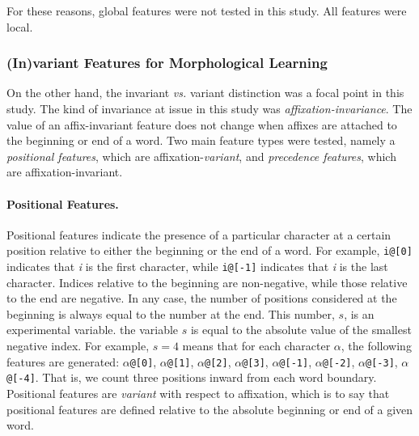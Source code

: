 For these reasons, global features were not tested in this study. All features were local. 


\subsubsection{(In)variant Features for Morphological Learning}
\label{sec:invariant-features}

On the other hand, the invariant \emph{vs.} variant distinction was a focal point in this study. The kind of invariance at issue in this study was \emph{affixation-invariance}. The value of an affix-invariant feature does not change when affixes are attached to the beginning or end of a word. Two main feature types were tested, namely a \emph{positional features}, which are affixation-\emph{variant}, and \emph{precedence features}, which are affixation-invariant.

\paragraph{Positional Features.}
Positional features
indicate the presence of a particular
character at a certain position relative to either the beginning or the end of 
a word. For example, \texttt{i@[0]} indicates that \textit{i} is the first 
character, while \texttt{i@[-1]} indicates that \textit{i} is the last character. 
Indices relative to the beginning are non-negative, while those relative 
to the end are negative. In any case, the number of positions considered 
at the beginning is always equal to the number at the end. This number, 
$s$, is an experimental variable.
the variable $s$ is equal to the absolute value of the smallest negative index. 
For example, $s=4$ means that for each character $\alpha$, the following 
features are generated: $\alpha$\texttt{@[0]}, $\alpha$\texttt{@[1]}, 
$\alpha$\texttt{@[2]}, $\alpha$\texttt{@[3]}, $\alpha$\texttt{@[-1]}, $\alpha$\texttt{@[-2]}, 
$\alpha$\texttt{@[-3]}, $\alpha$\texttt{@[-4]}.
That is, we count three positions inward from each word boundary.
Positional features are \emph{variant} 
with respect to affixation, which is to say that positional features are 
defined relative to the absolute beginning 
or end of a given word. 

